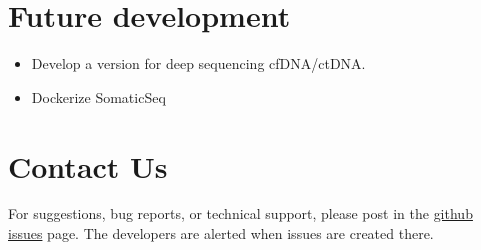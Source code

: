 \documentclass[10pt,letterpaper]{article}
\begin{document}
\begin{sloppypar}
\begin{itemize}
\end{itemize}





\section{Future development}

\begin{itemize}

  \item
  Develop a version for deep sequencing cfDNA/ctDNA.
  
  \item
  Dockerize SomaticSeq
  
\end{itemize}











\section{Contact Us}
For suggestions, bug reports, or technical support, please post in the \href{https://github.com/bioinform/somaticseq/issues}{github issues} page. The developers are alerted when issues are created there. 

\end{sloppypar}
\end{document}
